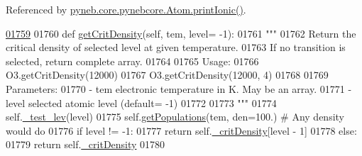 Referenced by \hyperlink{pynebcore_8py_source_l02233}{pyneb.\-core.\-pynebcore.\-Atom.\-print\-Ionic()}.


\begin{DoxyCode}
\hypertarget{classpyneb_1_1core_1_1pynebcore_1_1_atom_l01759}{}\hyperlink{classpyneb_1_1core_1_1pynebcore_1_1_atom_aae95b1cb36defadad24cf94459203eb3}{01759} 
01760     \textcolor{keyword}{def }\hyperlink{classpyneb_1_1core_1_1pynebcore_1_1_atom_aae95b1cb36defadad24cf94459203eb3}{getCritDensity}(self, tem, level= -1):
01761         \textcolor{stringliteral}{"""}
01762 \textcolor{stringliteral}{        Return the critical density of selected level at given temperature. }
01763 \textcolor{stringliteral}{        If no transition is selected, return complete array.}
01764 \textcolor{stringliteral}{        }
01765 \textcolor{stringliteral}{        Usage:}
01766 \textcolor{stringliteral}{            O3.getCritDensity(12000)}
01767 \textcolor{stringliteral}{            O3.getCritDensity(12000, 4)}
01768 \textcolor{stringliteral}{        }
01769 \textcolor{stringliteral}{        Parameters:}
01770 \textcolor{stringliteral}{            - tem    electronic temperature in K. May be an array.}
01771 \textcolor{stringliteral}{            - level  selected atomic level (default= -1)}
01772 \textcolor{stringliteral}{}
01773 \textcolor{stringliteral}{        """}
01774         self.\hyperlink{classpyneb_1_1core_1_1pynebcore_1_1_atom_afa4b9737dcd5bed31e25e8f0b6dc4730}{\_test\_lev}(level)
01775         self.\hyperlink{classpyneb_1_1core_1_1pynebcore_1_1_atom_aab7496403c8aaef40ab3b20b5c00e9f0}{getPopulations}(tem, den=100.) \textcolor{comment}{# Any density would do}
01776         \textcolor{keywordflow}{if} level != -1:
01777             \textcolor{keywordflow}{return} self.\hyperlink{classpyneb_1_1core_1_1pynebcore_1_1_atom_a1d0823a36ca030fd149522fe72908631}{\_critDensity}[level - 1]
01778         \textcolor{keywordflow}{else}:
01779             \textcolor{keywordflow}{return} self.\hyperlink{classpyneb_1_1core_1_1pynebcore_1_1_atom_a1d0823a36ca030fd149522fe72908631}{\_critDensity}
01780         
        
\end{DoxyCode}
